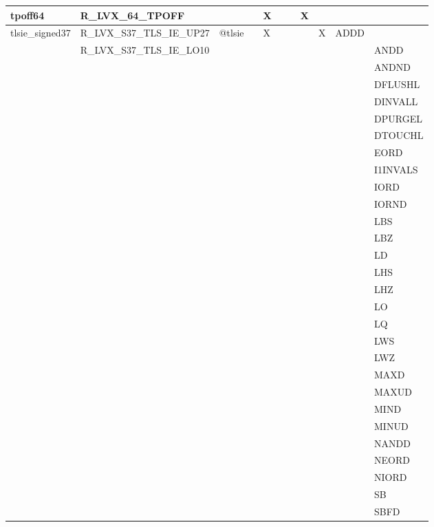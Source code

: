 {\begin{tabular}{|l|l|l|l|l|l|l|l|l|l|l|}
\hline
\textsf{tpoff64} & \textsf{R\_LVX\_64\_TPOFF} & \textsf{} & \textsf{} & \textsf{X} & \textsf{} & \textsf{} & \textsf{X} & \textsf{} & \textsf{} \\
\hline
\textsf{tlsie\_signed37} & \textsf{R\_LVX\_S37\_TLS\_IE\_UP27} & \textsf{@tlsie} & \textsf{} & \textsf{X} & \textsf{} & \textsf{} & \textsf{} & \textsf{X} & \textsf{ADDD} \\
 & \textsf{R\_LVX\_S37\_TLS\_IE\_LO10} & & & & & & & & & \textsf{ANDD} \\
 & & & & & & & & & & \textsf{ANDND} \\
 & & & & & & & & & & \textsf{DFLUSHL} \\
 & & & & & & & & & & \textsf{DINVALL} \\
 & & & & & & & & & & \textsf{DPURGEL} \\
 & & & & & & & & & & \textsf{DTOUCHL} \\
 & & & & & & & & & & \textsf{EORD} \\
 & & & & & & & & & & \textsf{I1INVALS} \\
 & & & & & & & & & & \textsf{IORD} \\
 & & & & & & & & & & \textsf{IORND} \\
 & & & & & & & & & & \textsf{LBS} \\
 & & & & & & & & & & \textsf{LBZ} \\
 & & & & & & & & & & \textsf{LD} \\
 & & & & & & & & & & \textsf{LHS} \\
 & & & & & & & & & & \textsf{LHZ} \\
 & & & & & & & & & & \textsf{LO} \\
 & & & & & & & & & & \textsf{LQ} \\
 & & & & & & & & & & \textsf{LWS} \\
 & & & & & & & & & & \textsf{LWZ} \\
 & & & & & & & & & & \textsf{MAXD} \\
 & & & & & & & & & & \textsf{MAXUD} \\
 & & & & & & & & & & \textsf{MIND} \\
 & & & & & & & & & & \textsf{MINUD} \\
 & & & & & & & & & & \textsf{NANDD} \\
 & & & & & & & & & & \textsf{NEORD} \\
 & & & & & & & & & & \textsf{NIORD} \\
 & & & & & & & & & & \textsf{SB} \\
 & & & & & & & & & & \textsf{SBFD} \\

\end{tabular}}
